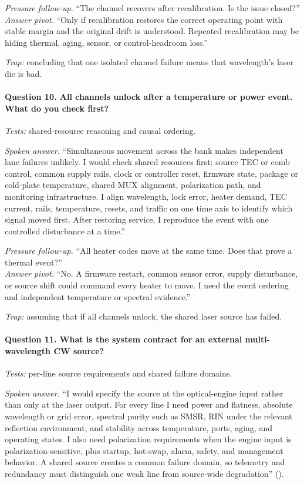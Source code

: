 \textit{Pressure follow-up.} ``The channel recovers after recalibration. Is the
issue closed?''\\
\textit{Answer pivot.} ``Only if recalibration restores the correct operating
point with stable margin and the original drift is understood. Repeated
recalibration may be hiding thermal, aging, sensor, or control-headroom loss.''

\textit{Trap:} concluding that one isolated channel failure means that
wavelength's laser die is bad.

\paragraph{Question 10. All channels unlock after a temperature or power event.
What do you check first?}
\textit{Tests:} shared-resource reasoning and causal ordering.

\textit{Spoken answer.}
``Simultaneous movement across the bank makes independent lane failures
unlikely. I would check shared resources first: source TEC or comb control,
common supply rails, clock or controller reset, firmware state, package or
cold-plate temperature, shared MUX alignment, polarization path, and monitoring
infrastructure. I align wavelength, lock error, heater demand, TEC current,
rails, temperature, resets, and traffic on one time axis to identify which
signal moved first. After restoring service, I reproduce the event with one
controlled disturbance at a time.''

\textit{Pressure follow-up.} ``All heater codes move at the same time. Does that
prove a thermal event?''\\
\textit{Answer pivot.} ``No. A firmware restart, common sensor error, supply
disturbance, or source shift could command every heater to move. I need the
event ordering and independent temperature or spectral evidence.''

\textit{Trap:} assuming that if all channels unlock, the shared laser source has
failed.

\paragraph{Question 11. What is the system contract for an external
multi-wavelength CW source?}
\textit{Tests:} per-line source requirements and shared failure domains.

\textit{Spoken answer.}
``I would specify the source at the optical-engine input rather than only at the
laser output. For every line I need power and flatness, absolute wavelength or
grid error, spectral purity such as SMSR, RIN under the relevant reflection
environment, and stability across temperature, ports, aging, and operating
states. I also need polarization requirements when the engine input is
polarization-sensitive, plus startup, hot-swap, alarm, safety, and management
behavior. A shared source creates a common failure domain, so telemetry and
redundancy must distinguish one weak line from source-wide degradation''
().

